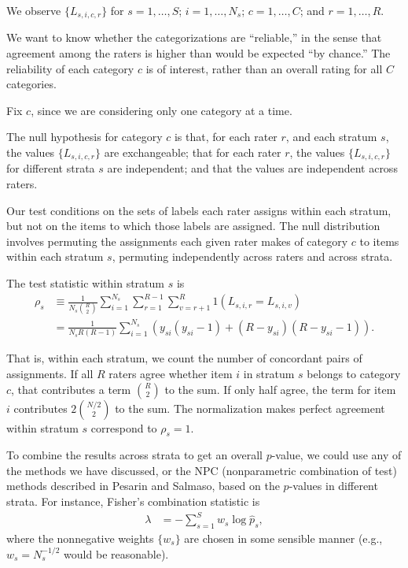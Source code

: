 \documentclass[]{article}
\begin{document}
We observe $\{ L_{s,i,c,r} \}$ for $s=1, \dots, S$;  $i=1, \dots, N_s$;
$c=1, \dots, C$; and $r=1, \dots, R$.

We want to know whether the categorizations are ``reliable,'' in the sense that
agreement among the raters is higher than would be expected ``by chance.''
The reliability of each category $c$ is of interest, rather than an overall
rating for all $C$ categories.

Fix $c$, since we are considering only one category at a time.

The null hypothesis for category $c$ is that, for each rater $r$, and each
stratum $s$, the values $\{ L_{s,i,c,r} \}$ are exchangeable; that for each
rater $r$, the values $\{ L_{s,i,c,r} \}$ for different strata $s$ are
independent; and that the values are independent across raters.

Our test conditions on the sets of labels each rater assigns within each
stratum, but not on the items to which those labels are assigned.
The null distribution involves permuting the assignments each given rater makes
of category $c$ to items within each stratum $s$, permuting independently
across raters and across strata.

The test statistic within stratum $s$ is
\begin{align*}
\rho_s &\equiv \frac{1}{N_s {R \choose 2}} \sum_{i=1}^{N_s}
              \sum_{r=1}^{R-1} \sum_{v=r+1}^R 1(L_{s,i,r} = L_{s,i,v}) \\
              &= \frac{1}{N_s R(R-1)} \sum_{i=1}^{N_s}
                (y_{si}(y_{si}-1) + (R-y_{si})(R-y_{si}-1)).
\end{align*}

That is, within each stratum, we count the number of concordant pairs of
assignments.
If all $R$ raters agree whether item $i$ in stratum $s$ belongs to category
$c$, that contributes a term ${R \choose 2}$ to the sum.
If only half agree, the term for item $i$ contributes $2 {N/2 \choose 2}$ to
the sum.
The normalization makes perfect agreement within stratum $s$ correspond to
$\rho_s = 1$.

To combine the results across strata to get an overall $p$-value, we could
use any of the methods we have discussed, or the NPC (nonparametric
combination of test) methods described in Pesarin and Salmaso, based on
the $p$-values in different strata.
For instance, Fisher's combination statistic is
\begin{align*}
    \lambda &= - \sum_{s=1}^S w_s \log \hat{p}_s,
\end{align*}
where the nonnegative weights $\{w_s\}$ are chosen in some sensible manner
(e.g., $w_s = N_s^{-1/2}$ would be reasonable).
\end{document}
